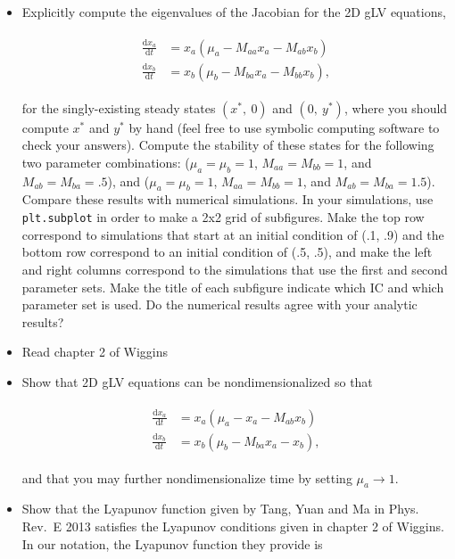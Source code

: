 \documentclass[]{article}
\def\tightlist{}
\begin{document}
\begin{itemize}
\tightlist
\item
  Explicitly compute the eigenvalues of the Jacobian for the 2D gLV
  equations,

  \begin{align} \begin{split}
      \frac{\text{d}x_a}{\text{d}t} &= x_a (\mu_a - M_{aa} x_a - M_{ab} x_b) \\
      \frac{\text{d}x_b}{\text{d}t} &= x_b (\mu_b - M_{ba} x_a - M_{bb} x_b),
  \end{split} \end{align}

  for the singly-existing steady states \((x^*, \ 0)\) and
  \((0, \ y^*)\), where you should compute \(x^*\) and \(y^*\) by hand
  (feel free to use symbolic computing software to check your answers).
  Compute the stability of these states for the following two parameter
  combinations: (\(\mu_a = \mu_b = 1\), \(M_{aa} = M_{bb} = 1\), and
  \(M_{ab} = M_{ba} = .5\)), and (\(\mu_a = \mu_b = 1\),
  \(M_{aa} = M_{bb} = 1\), and \(M_{ab} = M_{ba} = 1.5\)). Compare these
  results with numerical simulations. In your simulations, use
  \texttt{plt.subplot} in order to make a 2x2 grid of subfigures. Make
  the top row correspond to simulations that start at an initial
  condition of (.1, .9) and the bottom row correspond to an initial
  condition of (.5, .5), and make the left and right columns correspond
  to the simulations that use the first and second parameter sets. Make
  the title of each subfigure indicate which IC and which parameter set
  is used. Do the numerical results agree with your analytic results?
\item
  Read chapter 2 of Wiggins
\item
  Show that 2D gLV equations can be nondimensionalized so that

  \begin{align} \begin{split}
      \frac{\text{d}x_a}{\text{d}t} &= x_a (\mu_a - x_a - M_{ab} x_b) \\
      \frac{\text{d}x_b}{\text{d}t} &= x_b (\mu_b - M_{ba}x_a - x_b),
  \end{split} \end{align}

  and that you may further nondimensionalize time by setting
  \(\mu_a \to 1\).
\item
  Show that the Lyapunov function given by Tang, Yuan and Ma in Phys.
  Rev.~E 2013 satisfies the Lyapunov conditions given in chapter 2 of
  Wiggins. In our notation, the Lyapunov function they provide is


\end{itemize}
\end{document}
